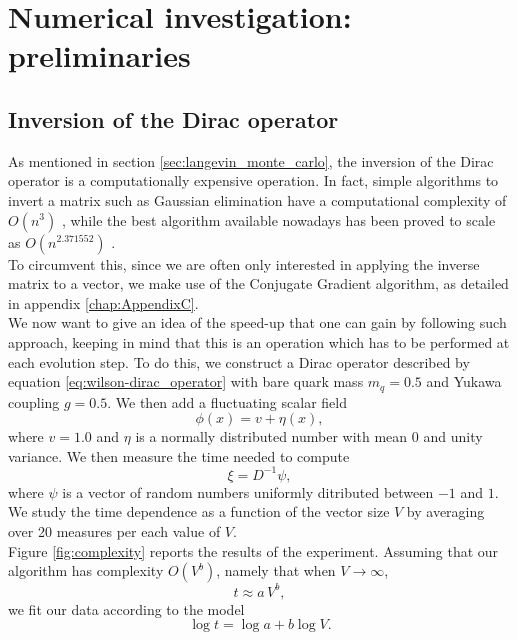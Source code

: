 \chapter{Numerical investigation: preliminaries}
\label{chapt:results_preliminary}
\section{Inversion of the Dirac operator}
\label{sec:inversion_dirac}
As mentioned in section \ref{sec:langevin_monte_carlo}, the inversion of the Dirac operator is a computationally expensive operation. In fact, simple algorithms to invert a matrix such as Gaussian elimination have a computational complexity of $O(n^3)$ \cite{cond_num_ref}, while the best algorithm available nowadays has been proved to scale as $O(n^{2.371552})$ \cite{williams2023new}. \\
To circumvent this, since we are often only interested in applying the inverse matrix to a vector, we make use of the Conjugate Gradient algorithm, as detailed in appendix \ref{chap:AppendixC}. \\
We now want to give an idea of the speed-up that one can gain by following such approach, keeping in mind that this is an operation which has to be performed at each evolution step. 
To do this, we construct a Dirac operator described by equation \eqref{eq:wilson-dirac_operator} with bare quark mass $m_q = 0.5$ and Yukawa coupling $g=0.5$. We then add a fluctuating scalar field 
\begin{equation*} 
    \phi(x) = v + \eta(x),
\end{equation*} 
where $v = 1.0$ and $\eta$ is a normally distributed number with mean $0$ and unity variance. We then measure the time needed to compute 
\begin{equation*}
    \xi = D^{-1}\psi,
\end{equation*}
where $\psi$ is a vector of random numbers uniformly ditributed between $-1$ and $1$. We study the time dependence as a function of the vector size $V$ by averaging over 20 measures per each value of $V$. \\
Figure \ref{fig:complexity} reports the results of the experiment. Assuming that our algorithm has complexity $O(V^b)$, namely that when $V \to \infty$,
\begin{equation*}
    t \approx a \, V^b,
\end{equation*}
we fit our data according to the model 
\begin{equation*}
    \log t = \log a + b \log V.
\end{equation*}
